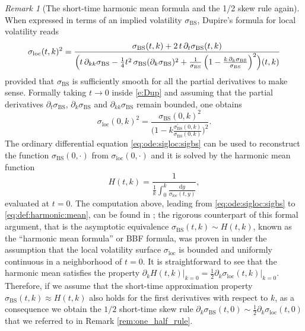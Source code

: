 \documentclass[11pt]{article}
\theoremstyle{plain}
\theoremstyle{definition}
\theoremstyle{remark}
\newtheorem{remark}[theorem]{Remark}
\newcommand{\R}{\mathbb{R}}
\newcommand{\be}{\beta}
\newcommand{\dd}{\mathrm{d}}
\newcommand{\1}{\mathbf{1}}
\numberwithin{equation}{section}
\def\maj{>}
\def\be{\begin{equation}}
\def\ee{\end{equation}}
\def\sigDup{\sigma_\mathrm{loc}}
\def\sigBS{\sigma_\mathrm{BS}}
\begin{document}
\begin{remark}[The short-time harmonic mean formula and the 1/2 skew rule again] \label{rem:harm_mean}
When expressed in terms of an implied volatility $\sigBS$, Dupire's formula for local volatility reads 
\be \label{e:Dup}
\sigDup(t,k)^2 = 
\frac{\sigBS(t,k) + 2 \, t \, \partial_t \sigBS(t,k)}
{\Bigl(
t \, \partial_{kk} \sigBS
- \frac 14 t^2 \, \sigBS (\partial_k \sigBS)^2
+ \frac 1 {\sigBS} \left(1 - \frac{k \, \partial_k \sigBS}{\sigBS}\right)^2 \Bigr)(t,k)} 
\ee
provided that $\sigBS$ is sufficiently smooth for all the partial derivatives to make sense.
Formally taking $t\to 0$ inside \eqref{e:Dup} and assuming that the partial derivatives $\partial_t \sigBS$, $\partial_k \sigBS$ and $\partial_{kk} \sigBS$
remain bounded,
one obtains
\begin{equation}\label{eq:ode:sigloc:sigbs}
	\sigDup(0,k)^2 = \frac{\sigBS(0,k)^2}{\bigl(1 - k \frac{\sigBS^{\prime} (0,k) }{\sigBS(0,k)}\bigr)^2}.
\end{equation}
The ordinary differential equation \eqref{eq:ode:sigloc:sigbs}
can be used to reconstruct the function $\sigBS(0, \cdot)$ from $\sigDup(0,\cdot)$ and it is solved
by
the harmonic mean function
\begin{equation}\label{eq:def:harmonic:mean}
	H(t,k) = \frac 1{\frac 1k \int_0^k \frac {\dd y}{\sigDup(t,y)}},
\end{equation}
evaluated at $t=0$.
The computation above, leading from \eqref{eq:ode:sigloc:sigbs} to \eqref{eq:def:harmonic:mean}, can be found in \cite{Lee2005}; the rigorous counterpart of this formal argument, that is the asymptotic equivalence $\sigBS(t, k) \sim H(t,k)$, 
known as the ``harmonic mean formula'' or BBF formula, was proven in \cite{BBF02}
under the assumption that the local volatility surface $\sigDup$ is bounded and uniformly continuous in a neighborhood of $t=0$.
It is straightforward to see that the harmonic mean satisfies the property $\partial_k H(t,k)\big|_{k=0} = \frac 12 \partial_k \sigDup(t,k)\big|_{k = 0}$.
Therefore, if we assume that the short-time approximation property $\sigBS(t,k) \approx H(t,k)$ also holds for the first derivatives with respect to $k$, as a consequence we obtain the $1/2$ short-time skew rule $\partial_k \sigBS(t,0) \sim 
\frac 12 \partial_k \sigDup(t,0)$ that we referred to in Remark \ref{rem:one_half_rule}.


\end{remark}
\end{document}
